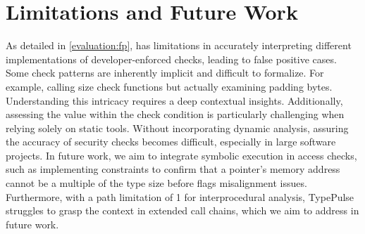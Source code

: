 \section{Limitations and Future Work}
{
As detailed in \autoref{evaluation:fp}, \TN has limitations in accurately interpreting different implementations of developer-enforced checks, leading to false positive cases.
%
Some check patterns are inherently implicit and difficult to formalize. For example, calling size check functions but actually examining padding bytes.
Understanding this intricacy requires a deep contextual insights. 
Additionally, assessing the value within the check condition is particularly challenging when relying solely on static tools. 
Without incorporating dynamic analysis, assuring the accuracy of security checks becomes difficult, especially in large software projects. 
In future work, we aim to integrate symbolic execution in access checks, such as implementing constraints to confirm that a pointer's memory address cannot be a multiple of the type size before \TN flags misalignment issues.
}
{Furthermore, with a path limitation of 1 for interprocedural analysis, TypePulse struggles to grasp the context in extended call chains,
which we aim to address in future work.}